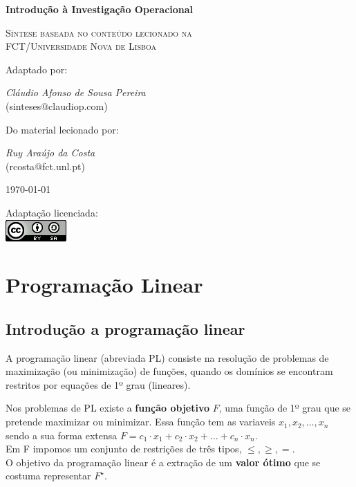 \documentclass[]{report}
\begin{document}
\begin{titlepage}
	\centering
	\vspace{5cm}
	{\huge\bfseries Introdução à Investigação Operacional\par}
	\vspace{1cm}
	{\scshape\Large Síntese baseada no conteúdo lecionado na\\
	 FCT/Universidade Nova de Lisboa\par}
	\vspace{2cm}
	Adaptado por:\\
	{\Large \textit{Cláudio Afonso de Sousa Pereira}\\
	(sinteses$\text{@}$claudiop$.$com)\par}
	\vspace{1cm}
	Do material lecionado por:\\
	{\Large \textit{Ruy Araújo da Costa}\\
	(rcosta$\text{@}$fct$.$unl$.$pt)\par}
	\vspace{1cm}
	{\large \today\par}
	\vfill
	Adaptação licenciada:\\
	\href{http://creativecommons.org/licenses/by-sa/4.0/}{\includegraphics[scale=0.8]{ccbysa.png}}
\end{titlepage}
\chapter{Programação Linear}
\section{Introdução a programação linear}
A programação linear (abreviada PL) consiste na resolução de problemas de maximização (ou minimização) de funções, quando os domínios se encontram restritos por equações de 1º grau (lineares).\\ \par
Nos problemas de PL existe a \textbf{função objetivo} $F$, uma função de 1º grau que se pretende maximizar ou minimizar. Essa função tem as variaveis $x_1, x_2, \dots, x_n$ sendo a sua forma extensa $F=c_1 \cdot x_1 + c_2 \cdot x_2 + \dots + c_n \cdot x_n$.\\
Em F impomos um conjunto de restrições de três tipos, $\leq, \geq, =$.\\
O objetivo da programação linear é a extração de um \textbf{valor ótimo} que se costuma representar $F^\star$.
\end{document}
